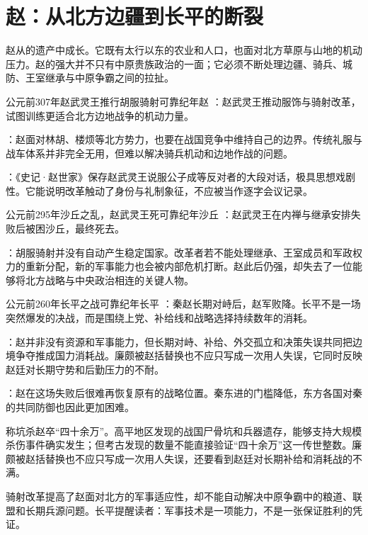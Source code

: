 \section{赵：从北方边疆到长平的断裂}

赵从的遗产中成长。它既有太行以东的农业和人口，也面对北方草原与山地的机动压力。赵的强大并不只有中原贵族政治的一面；它必须不断处理边疆、骑兵、城防、王室继承与中原争霸之间的拉扯。

\begin{event}{公元前307年}{赵武灵王推行胡服骑射}{可靠纪年}{赵}
：赵武灵王推动服饰与骑射改革，试图训练更适合北方边地战争的机动力量。

：赵面对林胡、楼烦等北方势力，也要在战国竞争中维持自己的边界。传统礼服与战车体系并非完全无用，但难以解决骑兵机动和边地作战的问题。

：《史记·赵世家》保存赵武灵王说服公子成等反对者的大段对话，极具思想戏剧性。它能说明改革触动了身份与礼制象征，不应被当作逐字会议记录。
\end{event}

\begin{event}{公元前295年}{沙丘之乱，赵武灵王死}{可靠纪年}{沙丘}
：赵武灵王在内禅与继承安排失败后被困沙丘，最终死去。

：胡服骑射并没有自动产生稳定国家。改革者若不能处理继承、王室成员和军政权力的重新分配，新的军事能力也会被内部危机打断。赵此后仍强，却失去了一位能够将北方战略与中央政治相连的关键人物。
\end{event}

\begin{event}{公元前260年}{长平之战}{可靠纪年}{长平}
：秦赵长期对峙后，赵军败降。长平不是一场突然爆发的决战，而是围绕上党、补给线和战略选择持续数年的消耗。

：赵并非没有资源和军事能力，但长期对峙、补给、外交孤立和决策失误共同把边境争夺推成国力消耗战。廉颇被赵括替换也不应只写成一次用人失误，它同时反映赵廷对长期守势和后勤压力的不耐。

：赵在这场失败后很难再恢复原有的战略位置。秦东进的门槛降低，东方各国对秦的共同防御也因此更加困难。
\end{event}

\begin{sourcenote}
称坑杀赵卒“四十余万”。高平地区发现的战国尸骨坑和兵器遗存，能够支持大规模杀伤事件确实发生；但考古发现的数量不能直接验证“四十余万”这一传世整数。廉颇被赵括替换也不应只写成一次用人失误，还要看到赵廷对长期补给和消耗战的不满。
\end{sourcenote}



\begin{turningpoint}
骑射改革提高了赵面对北方的军事适应性，却不能自动解决中原争霸中的粮道、联盟和长期兵源问题。长平提醒读者：军事技术是一项能力，不是一张保证胜利的凭证。
\end{turningpoint}
